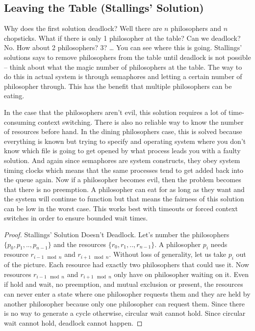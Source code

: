\subsection{Leaving the Table (Stallings' Solution)}

Why does the first solution deadlock?
Well there are $n$ philosophers and $n$ chopsticks.
What if there is only 1 philosopher at the table?
Can we deadlock?
No.
How about 2 philosophers?
3? \ldots{} You can see where this is going.
Stallings' \cite[P. 280]{stalling} solutions says to remove philosophers from the table until deadlock is not possible -- think about what the magic number of philosophers at the table.
The way to do this in actual system is through semaphores and letting a certain number of philosopher through.
This has the benefit that multiple philosophers can be eating.

In the case that the philosophers aren't evil, this solution requires a lot of time-consuming context switching.
There is also no reliable way to know the number of resources before hand.
In the dining philosophers case, this is solved because everything is known but trying to specify and operating system where you don't know which file is going to get opened by what process leads you with a faulty solution.
And again since semaphores are system constructs, they obey system timing clocks which means that the same processes tend to get added back into the queue again.
Now if a philosopher becomes evil, then the problem becomes that there is no preemption.
A philosopher can eat for as long as they want and the system will continue to function but that means the fairness of this solution can be low in the worst case.
This works best with timeouts or forced context switches in order to ensure bounded wait times.

\begin{proof} Stallings' Solution Doesn't Deadlock.
  Let's number the philosophers $\{p_0, p_1, .., p_{n-1}\}$ and the resources $\{r_0, r_1, .., r_{n-1}\}$.
  A philosopher $p_i$ needs resource $r_{i-1 \mod n}$ and $r_{i + 1 \mod n}$.
  Without loss of generality, let us take $p_i$ out of the picture.
  Each resource had exactly two philosophers that could use it.
  Now resources $r_{i-1 \mod n}$ and $r_{i + 1 \mod n}$ only have on philosopher waiting on it.
  Even if hold and wait, no preemption, and mutual exclusion or present, the resources can never enter a state where one philosopher requests them and they are held by another philosopher because only one philosopher can request them.
  Since there is no way to generate a cycle otherwise, circular wait cannot hold.
  Since circular wait cannot hold, deadlock cannot happen.
\end{proof}

